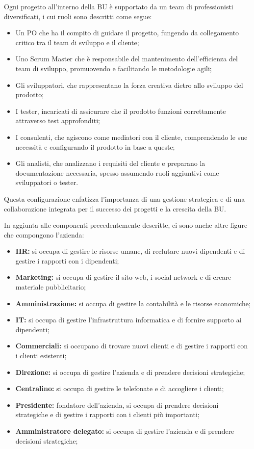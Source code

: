 \noindent Ogni progetto all'interno della BU è supportato da un team di professionisti diversificati, i cui ruoli sono descritti come segue:
\begin{itemize}
\item Un \gls{PO} che ha il compito di guidare il progetto, fungendo da collegamento critico tra il team di sviluppo e il cliente;
\item Uno \gls{Scrum Master} che è responsabile del mantenimento dell'efficienza del team di sviluppo, 
promuovendo e facilitando le metodologie agili;
\item Gli sviluppatori, che rappresentano la forza creativa dietro allo sviluppo del prodotto;
\item I tester, incaricati di assicurare che il prodotto funzioni correttamente attraverso test approfonditi;
\item I consulenti, che agiscono come mediatori con il cliente, comprendendo le sue necessità e configurando il prodotto in base a queste;
\item Gli \gls{analisti}, che analizzano i requisiti del cliente e preparano la documentazione necessaria, spesso assumendo ruoli aggiuntivi come sviluppatori o tester.
\end{itemize}

\noindent Questa configurazione enfatizza l'importanza di una gestione strategica e di una collaborazione integrata per il successo dei progetti e la crescita della BU.






\noindent In aggiunta alle componenti precedentemente descritte, ci sono anche altre figure che compongono l'azienda:
\begin{itemize}
  \item \textbf{HR:} si occupa di gestire le risorse umane, di reclutare nuovi dipendenti e di gestire i rapporti con i dipendenti;
  \item \textbf{Marketing:} si occupa di gestire il sito web, i social network e di creare materiale pubblicitario;
  \item \textbf{Amministrazione:} si occupa di gestire la contabilità e le risorse economiche;
  \item \textbf{IT:} si occupa di gestire l'infrastruttura informatica e di fornire supporto ai dipendenti;
  \item \textbf{Commerciali:} si occupano di trovare nuovi clienti e di gestire i rapporti con i clienti esistenti;
  \item \textbf{Direzione:} si occupa di gestire l'azienda e di prendere decisioni strategiche;
  \item \textbf{Centralino:} si occupa di gestire le telefonate e di accogliere i clienti;
  \item \textbf{Presidente:} fondatore dell'azienda, si occupa di prendere decisioni strategiche e di gestire i rapporti con i clienti più importanti;
  \item \textbf{Amministratore delegato:} si occupa di gestire l'azienda e di prendere decisioni strategiche;
\end{itemize}

